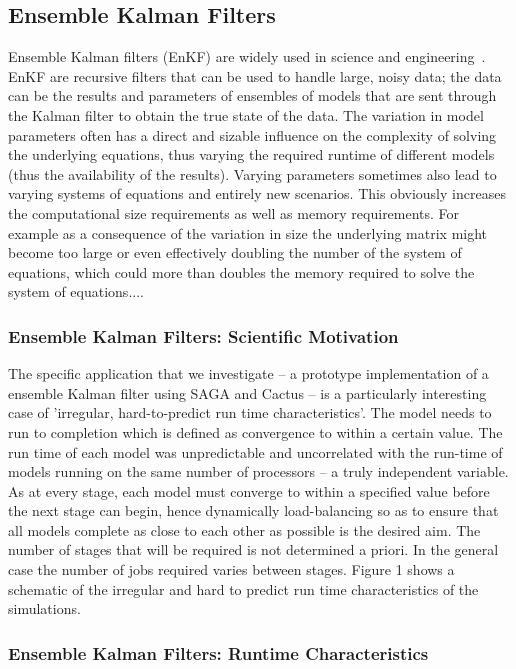 \documentclass[conference,final]{IEEEtran}
\begin{document}
\subsection{Ensemble Kalman Filters} 

Ensemble Kalman filters (EnKF) are widely used in science and
engineering~\cite{DataAssim, KalmanPaper}. EnKF are recursive filters
that can be used to handle large, noisy data; the data can be the
results and parameters of ensembles of models that are sent through
the Kalman filter to obtain the true state of the data. The variation
in model parameters often has a direct and sizable influence on the
complexity of solving the underlying equations, thus varying the
required runtime of different models (thus the availability of the
results).  Varying parameters sometimes also lead to varying systems
of equations and entirely new scenarios. This obviously increases the
computational size requirements as well as memory requirements.  For
example as a consequence of the variation in size the underlying
matrix might become too large or even effectively doubling the number
of the system of equations, which could more than doubles the memory
required to solve the system of equations....

\subsubsection{Ensemble Kalman Filters: Scientific Motivation}
The specific application that we investigate -- a prototype
implementation of a ensemble Kalman filter using SAGA and Cactus -- is
a particularly interesting case of 'irregular, hard-to-predict run
time characteristics'.  The model needs to run to completion which is
defined as convergence to within a certain value.  The run time of
each model was unpredictable and uncorrelated with the run-time of
models running on the same number of processors -- a truly independent
variable.  As at every stage, each model must converge to within a
specified value before the next stage can begin, hence dynamically
load-balancing so as to ensure that all models complete as close to
each other as possible is the desired aim.  The number of stages that
will be required is not determined a priori. In the general case the
number of jobs required varies between stages.  Figure 1 shows a
schematic of the irregular and hard to predict run time
characteristics of the simulations.

\subsubsection{Ensemble Kalman Filters: Runtime Characteristics}
\end{document}

